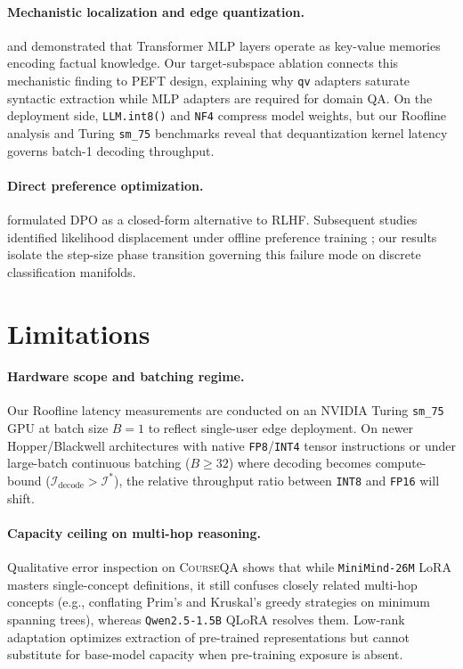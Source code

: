 \documentclass[10pt,a4paper,twocolumn]{article}
\begin{document}
\paragraph{Mechanistic localization and edge quantization.}
\citet{geva2021transformer} and \citet{meng2022locating} demonstrated that Transformer MLP layers operate as key-value memories encoding factual knowledge. Our target-subspace ablation connects this mechanistic finding to PEFT design, explaining why \texttt{qv} adapters saturate syntactic extraction while MLP adapters are required for domain QA. On the deployment side, \texttt{LLM.int8()} \citep{dettmers2022llm} and \texttt{NF4} \citep{dettmers2023qlora} compress model weights, but our Roofline analysis \citep{williams2009roofline} and Turing \texttt{sm\_75} benchmarks reveal that dequantization kernel latency governs batch-1 decoding throughput.

\paragraph{Direct preference optimization.}
\citet{rafailov2023direct} formulated DPO as a closed-form alternative to RLHF. Subsequent studies identified likelihood displacement under offline preference training \citep{pal2024smaug,tajwar2024preference}; our results isolate the step-size phase transition governing this failure mode on discrete classification manifolds.

\section{Limitations}
\label{sec:limitations}

\paragraph{Hardware scope and batching regime.}
Our Roofline latency measurements are conducted on an NVIDIA Turing \texttt{sm\_75} GPU at batch size $B=1$ to reflect single-user edge deployment. On newer Hopper/Blackwell architectures with native \texttt{FP8}/\texttt{INT4} tensor instructions or under large-batch continuous batching ($B \ge 32$) where decoding becomes compute-bound ($\mathcal{I}_{\text{decode}} > \mathcal{I}^*$), the relative throughput ratio between \texttt{INT8} and \texttt{FP16} will shift.

\paragraph{Capacity ceiling on multi-hop reasoning.}
Qualitative error inspection on \textsc{CourseQA} shows that while \texttt{MiniMind-26M} LoRA masters single-concept definitions, it still confuses closely related multi-hop concepts (e.g., conflating Prim's and Kruskal's greedy strategies on minimum spanning trees), whereas \texttt{Qwen2.5-1.5B} QLoRA resolves them. Low-rank adaptation optimizes extraction of pre-trained representations but cannot substitute for base-model capacity when pre-training exposure is absent.
\end{document}
